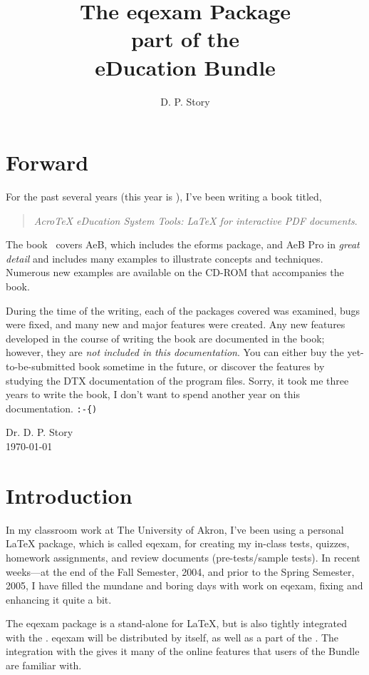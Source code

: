 \documentclass{article}
\title[dps]{The \texorpdfstring{\textsf{eqexam} Package\\}{eqexam Package, }
part of the\texorpdfstring{\\}{ }\texorpdfstring{\AcroTeX}{AcroTeX} eDucation Bundle}
\author{D. P. Story}
\def\AEBBook{\textsl{{Acro\!\TeX} eDucation System Tools: {\LaTeX} for interactive PDF documents}}
\def\AEBP{\textsf{AeB Pro}}
\let\pkg\textsf
\def\AEB{\textsf{AeB}}
\begin{document}
\maketitle

\tableofcontents

\section{Forward}

For the past several years (this year is \the\year), I've been writing a book
titled,
\begin{quote}
\AEBBook.
\end{quote}
The book~\cite{book:AEBB} covers {\AEB}, which includes the \pkg{eforms}
package, and {\AEBP} in \emph{great detail} and includes many examples to
illustrate concepts and techniques. Numerous new examples are available on
the CD-ROM that accompanies the book.

During the time of the writing, each of the packages covered was examined,
bugs were fixed, and many new and major features were created. Any new
features developed in the course of writing the book are documented in the
book; however, they are \emph{not included in this documentation}. You can
either buy the yet-to-be-submitted book sometime in the future, or discover
the features by studying the DTX documentation of the program files. Sorry,
it took me three years to write the book, I don't want to spend another year
on this documentation. \verb!:-{)!

\begin{flushright}
Dr. D. P. Story\\[3pt]
\today
\end{flushright}

\section{Introduction}

In my classroom work at The University of Akron, I've been using a
personal {\LaTeX} package, which is called \textsf{eqexam}, for creating
my in-class tests, quizzes, homework assignments, and review documents
(pre-tests/sample tests). In recent weeks---at the end of the Fall
Semester, 2004, and prior to the Spring Semester, 2005, I have filled the
mundane and boring days with work on \textsf{eqexam}, fixing and enhancing
it quite a bit.

The \textsf{eqexam} package is a stand-alone for {\LaTeX}, but is also
tightly integrated with the {\cAcroEB}. \textsf{eqexam} will be
distributed by itself, as well as a part of the {\cAcroB}. The integration
with the {\AcroB} gives it many of the online features that users of the
Bundle are familiar with.
\end{document}
